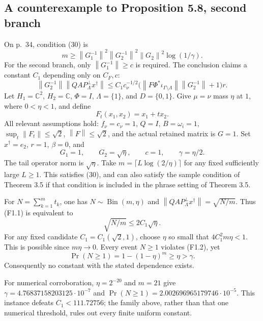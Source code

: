 \documentclass[10pt]{article}
\begin{document}
\subsection*{A counterexample to Proposition 5.8, second branch}
On p. 34, condition (30) is \[m\ge \left\lVert G_1^{-1}\right\rVert^2\left\lVert G_2^{-1}\right\rVert^2\left\lVert G_2\right\rVert^2
       \log(1/\gamma).\] For the second branch, only \(\left\lVert G_1^{-1}\right\rVert\ge c\) is required. The conclusion claims a constant \(C_1\) depending only on \(C_F,c\): \[\left\lVert G_2^{-1}\right\rVert\left\lVert QAP_\Lambda^\perp x^\dagger\right\rVert
 \le C_1c_\nu^{-1/2}
 \bigl(\left\lVert F\Phi^*\iota_{\Gamma\setminus\Lambda}\right\rVert\left\lVert G_2^{-1}\right\rVert+1\bigr)r.
\tag{F1.1}\] Let \(H_1=\mathbb C^2\), \(H_2=\mathbb C\), \(\Phi=I\), \(\Lambda=\{1\}\), and \(D=\{0,1\}\). Give \(\mu=\nu\) mass \(\eta\) at \(1\), where \(0<\eta<1\), and define \[F_t(x_1,x_2)=x_1+t x_2.\] All relevant assumptions hold: \(f_\nu=c_\nu=1\), \(Q=I\), \(B=\omega_i=1\), \(\sup_t\left\lVert F_t\right\rVert\le\sqrt2\), \(\left\lVert F\right\rVert\le\sqrt2\), and the actual retained matrix is \(G=1\). Set \(x^\dagger=e_2\), \(r=1\), \(\beta=0\), and \[G_1=1,\qquad G_2=\sqrt\eta,\qquad c=1,\qquad
\gamma=\eta/2.\] The tail operator norm is \(\sqrt\eta\). Take \(m=\lceil L\log(2/\eta)\rceil\) for any fixed sufficiently large \(L\ge1\). This satisfies (30), and can also satisfy the sample condition of Theorem 3.5 if that condition is included in the phrase setting of Theorem 3.5.\par
For \(N=\sum_{k=1}^m t_k\), one has \(N\sim\operatorname{Bin}(m,\eta)\) and \(\left\lVert QAP_\Lambda^\perp x^\dagger\right\rVert=\sqrt{N/m}\). Thus (F1.1) is equivalent to \[\sqrt{N/m}\le 2C_1\sqrt\eta.
\tag{F1.2}\] For any fixed candidate \(C_1=C_1(\sqrt2,1)\), choose \(\eta\) so small that \(4C_1^2m\eta<1\). This is possible since \(m\eta\to0\). Every event \(N\ge1\) violates (F1.2), yet \[\Pr(N\ge1)=1-(1-\eta)^m\ge\eta>\gamma.\] Consequently no constant with the stated dependence exists.\par
For numerical corroboration, \(\eta=2^{-20}\) and \(m=21\) give \(\gamma=4.76837158203125\cdot10^{-7}\) and \(\Pr(N\ge1)=2.002696965179746\cdot10^{-5}\). This instance defeats \(C_1<111.72756\); the family above, rather than that one numerical threshold, rules out every finite uniform constant.\par
\end{document}

